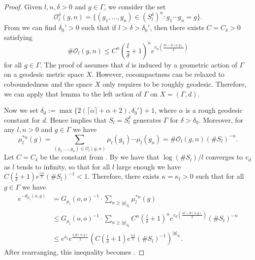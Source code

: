\documentclass[twoside]{amsart}
\theoremstyle{definition}
\numberwithin{equation}{section}
\numberwithin{theorem}{section}
\newcommand{\calO}{\mathcal{O}}
\newcommand{\al}{\alpha}
\newcommand{\G}{\Gamma}
\newcommand{\del}{\delta}
\renewcommand{\k}{\kappa}
\newcommand{\m}{\mu}
\begin{document}
\begin{proof}
    Given $l,n,\del>0$ and $g\in \G$, we consider the set 
    $$\calO_l^\del(g,n)=\{(g_1,\dots,g_n)\in (S_l^\del)^{n}\colon g_1\cdots g_n=g\}.$$
     From \cite[Lemma~B.3]{CDS} we can find $\del_0'>0$ such that if $l>\del>\del_0'$, then there exists $C=C_\del>0$ satisfying 
    \begin{equation}\label{eq.ineqO}
        \#\calO_l(g,n)\leq C^n\left(\frac{l}{\del}+1\right)^ne^{v_d\left(\frac{nl-d(o,g)}{2}\right)}
    \end{equation}
    for all $g\in \G$. The proof of \cite[Lemma~B.3]{CDS} assumes that $d$ is induced by a geometric action of $\G$ on a geodesic metric space $X$.  However, cocompactness can be relaxed to coboundedness and the space $X$ only requires to be roughly geodesic. Therefore, we can apply that lemma to the left action of $\G$ on $X=(\G,d)$.

    Now we set $\del_0:=\max\{2(\lceil{\al\rceil}+\al+2),\del_0'\}+1$, where $\al$ is a rough geodesic constant for $d$. Hence  implies that $S_l=S_l^\del$ generates $\G$ for $\del>\del_0$. Moreover, for any $l,n>0$ and $g\in \G$ we have
    $$\m_{l}^{\ast n}(g)=\sum_{(g_1,\dots,g_n)\in \calO_{l}(g,n)}{\m_l(g_1)\cdots \m_l(g_n)}=\#\calO_{l}(g,n)(\#S_l)^{-n}.$$
    Let $C=C_\del$ be the constant from . By  we have that $\log (\# S_l) /l$ converges to $v_d$ as $l$ tends to infinity, so that for all $l$ large enough we have $C(\frac{l}{\del}+1)e^{\frac{v_dl}{2}}(\# S_l)^{-1}<1$. Therefore, there exists $\k=\k_l>0$ such that for all $g\in \G$ we have
    \begin{align*}
         e^{-d_{\m_l}(o,g)} & =G_{\m_l}(o,o)^{-1}\cdot \sum_{n\geq |g|_{S_l}}{\m_l^{\ast n}(g)}\\
         & \leq G_{\m_l}(o,o)^{-1}\cdot 
         \sum_{n\geq |g|_{S_l}}{C^n\left(\frac{l}{\del}+1\right)^ne^{v_d\left(\frac{nl-d(o,g)}{2}\right)}(\# S_l)^{-n}}\\
         & \leq e^{\k_l}e^{\frac{v_d d(o,g)}{2}}{\left(C\left(\frac{l}{\del}+1\right)e^{\frac{v_dl}{2}}(\# S_l)^{-1} \right)^{|g|_{S_l}} }.
    \end{align*}
    After rearranging, this inequality becomes . 
\end{proof}
\end{document}
